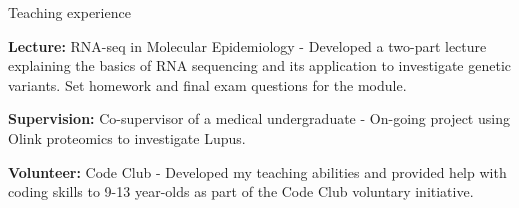 \documentclass{resume}
\begin{document}
\begin{rSection}{Teaching experience}

\item \textbf{Lecture:} RNA-seq in Molecular Epidemiology - Developed a two-part lecture explaining the basics of RNA sequencing and its application to investigate genetic variants. Set homework and final exam questions for the module.
\vspace{2pt plus 1pt minus 1pt}

\item \textbf{Supervision:} Co-supervisor of a medical undergraduate - On-going project using Olink proteomics to investigate Lupus.

\vspace{2pt plus 1pt minus 1pt}

\item \textbf{Volunteer:} Code Club - Developed my teaching abilities and provided help with coding skills to 9-13 year-olds as part of the Code Club voluntary initiative.
\vspace{2pt plus 1pt minus 1pt}

\end{rSection}
\end{document}
